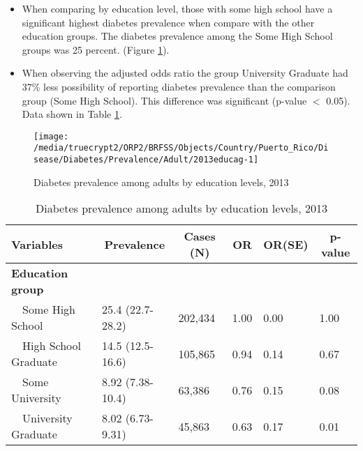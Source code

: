 \newpage
\begin{itemize}

\item When comparing by education level, those with
some high school
have a significant highest diabetes prevalence when compare with the other education groups. The diabetes prevalence among the Some High School groups was 25 percent.
(Figure \ref{fig:edu.Diabetes.2013}).

\item 
When observing the adjusted odds ratio the group University Graduate had 37\% less possibility of reporting diabetes prevalence than the comparison group (Some High School).
This difference was significant (p-value $<$ 0.05).  Data shown in Table \ref{tab:edu.Diabetes.2013}.

\end{itemize}

\begin{figure}[H]
\caption{Diabetes prevalence among adults by education levels, 
         2013}
\begin{knitrout}
\color{fgcolor}

{\centering \texttt{[image: /media/truecrypt2/ORP2/BRFSS/Objects/Country/Puerto\_Rico/Disease/Diabetes/Prevalence/Adult/2013educag-1]} 

}



\end{knitrout}
 \label{fig:edu.Diabetes.2013}
\end{figure}

\begin{table}[H]
\caption{Diabetes prevalence  among adults by education levels, 2013\label{tab:edu.Diabetes.2013}} 
\begin{center}
\begin{tabular}{llllll}
\hline\hline
\multicolumn{1}{l}{Variables}&\multicolumn{1}{c}{Prevalence}&\multicolumn{1}{c}{Cases (N)}&\multicolumn{1}{c}{OR}&\multicolumn{1}{c}{OR(SE)}&\multicolumn{1}{c}{p-value}\tabularnewline
\hline
{\bfseries Education group}&&&&&\tabularnewline
~~Some High School&25.4 (22.7-28.2)&202,434&1.00&0.00&1.00\tabularnewline
~~High School Graduate&14.5 (12.5-16.6)&105,865&0.94&0.14&0.67\tabularnewline
~~Some University&8.92 (7.38-10.4)& 63,386&0.76&0.15&0.08\tabularnewline
~~University Graduate&8.02 (6.73-9.31)& 45,863&0.63&0.17&0.01\tabularnewline
\hline
\end{tabular}\end{center}

\end{table}


